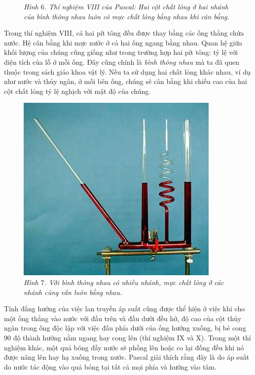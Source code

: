 \begin{multicols}{2}
\begin{figure}[H]
		\caption{\small\textit{\color{timhieukhoahoc}Hình $6$. Thí nghiệm VIII của Pascal: Hai cột chất lỏng ở hai nhánh của bình thông nhau luôn có mực chất lỏng bằng nhau khi cân bằng.}}
		\vspace*{-10pt}
	\end{figure}
	Trong thí nghiệm VIII, cả hai pít tông đều được thay bằng các ống thẳng chứa nước. Hệ cân bằng khi mực nước ở cả hai ống ngang bằng nhau. Quan hệ giữa khối lượng của chúng cũng giống như trong trường hợp hai pít tông: tỷ lệ với diện tích của lỗ ở mỗi ống. Đây cũng chính là \textit{bình thông nhau} mà ta đã quen thuộc trong sách giáo khoa vật lý. Nếu ta sử dụng hai chất lỏng khác nhau, ví dụ như nước và thủy ngân, ở mỗi bên ống, chúng sẽ cân bằng khi chiều cao của hai cột chất lỏng tỷ lệ nghịch với mật độ của chúng.
	\begin{figure}[H]
		\vspace*{-5pt}
		\centering
		\captionsetup{labelformat= empty, justification=centering}
		\includegraphics[width= 0.75\linewidth]{9}
		\caption{\small\textit{\color{timhieukhoahoc}Hình $7$. Với bình thông nhau có nhiều nhánh, mực chất lỏng ở các nhánh cũng vẫn luôn bằng nhau.}}
		\vspace*{-10pt}
	\end{figure}
	Tính đẳng hướng của việc lan truyền áp suất cũng được thể hiện ở việc khi cho một ống thẳng vào nước với đầu trên và đầu dưới đều hở, độ cao của cột thủy ngân trong ống độc lập với việc đầu phía dưới của ống hướng xuống, bị bẻ cong $90$ độ thành hướng nằm ngang hay cong lên (thí nghiệm IX và X). Trong một thí nghiệm khác, một quả bóng đầy nước sẽ phồng lên hoặc co lại đồng đều khi nó được nâng lên hay hạ xuống trong nước. Pascal giải thích rằng đây là do áp suất do nước tác động vào quả bóng tại tất cả mọi phía và hướng vào tâm.

\end{multicols}
